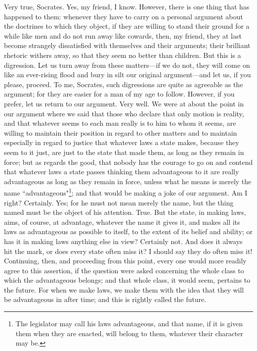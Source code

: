 \documentclass[letterpaper,12pt]{article}
\newcommand{\stephpag}[1]{\marginnote{\small\itshape\fontfamily{ppl}\selectfont #1}}
\begin{document}
\begin{drama}
\theodorusspeaks
Very true, Socrates. \stephpag{b}
\socratesspeaks
Yes, my friend, I know. However, there is one thing that has happened to them: whenever they have to carry on a personal argument about the doctrines to which they object, if they are willing to stand their ground for a while like men and do not run away like cowards, then, my friend, they at last become strangely dissatisfied with themselves and their arguments; their brilliant rhetoric withers away, so that they seem no better than children. But this is a digression. Let us turn away from these matters—if we do not, \stephpag{c} they will come on like an ever-rising flood and bury in silt our original argument—and let us, if you please, proceed.
\theodorusspeaks
To me, Socrates, such digressions are quite as agreeable as the argument; for they are easier for a man of my age to follow. However, if you prefer, let us return to our argument.
\socratesspeaks
Very well. We were at about the point in our argument where we said that those who declare that only motion is reality, and that whatever seems to each man really is to him to whom it seems, are willing to maintain their position in regard to other matters \stephpag{d} and to maintain especially in regard to justice that whatever laws a state makes, because they seem to it just, are just to the state that made them, as long as they remain in force; but as regards the good, that nobody has the courage to go on and contend that whatever laws a state passes thinking them advantageous to it are really advantageous as long as they remain in force, unless what he means is merely the name ``advantageous"\footnote{The legislator may call his laws advantageous, and that name, if it is given them when they are enacted, will belong to them, whatever their character may be.}; and that would be making a joke of our argument. Am I right?
\theodorusspeaks
Certainly. \stephpag{e}
\socratesspeaks
Yes; for he must not mean merely the name, but the thing named must be the object of his attention.
\theodorusspeaks
True.
\socratesspeaks
But the state, in making laws, aims, of course, at advantage, whatever the name it gives it, and makes all its laws as advantageous as possible to itself, to the extent of its belief and ability; or has it in making laws anything else in view? \stephpag{178 a}
\theodorusspeaks
Certainly not.
\socratesspeaks
And does it always hit the mark, or does every state often miss it?
\theodorusspeaks
I should say they do often miss it!
\socratesspeaks
Continuing, then, and proceeding from this point, every one would more readily agree to this assertion, if the question were asked concerning the whole class to which the advantageous belongs; and that whole class, it would seem, pertains to the future. For when we make laws, we make them with the idea that they will be advantageous in after time; and this is rightly called the future. \stephpag{b}

\end{drama}
\end{document}
